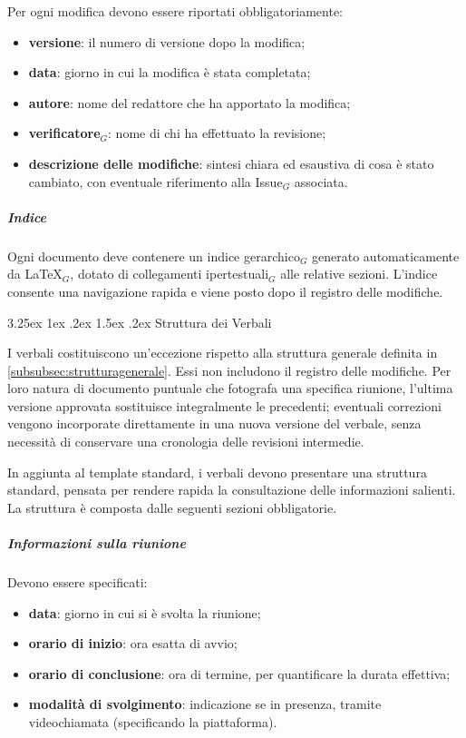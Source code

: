 \documentclass[a4paper, 10pt]{article}
\makeatletter
\renewcommand\paragraph{\@startsection{paragraph}{4}{\z@}%
  {3.25ex \@plus1ex \@minus .2ex}%
  {1.5ex \@plus .2ex}%
  {\normalfont\normalsize\bfseries}}
\makeatother
\begin{document}
Per ogni modifica devono essere riportati obbligatoriamente:
\begin{itemize}
    \item \textbf{versione}: il numero di versione dopo la modifica;
    \item \textbf{data}: giorno in cui la modifica è stata completata;
    \item \textbf{autore}: nome del redattore che ha apportato la modifica;
    \item \textbf{verificatore$_G$}: nome di chi ha effettuato la revisione;
    \item \textbf{descrizione delle modifiche}: sintesi chiara ed esaustiva di cosa è stato cambiato, con eventuale riferimento alla Issue$_G$ associata.
\end{itemize}

\subparagraph{Indice}

Ogni documento deve contenere un indice gerarchico$_G$ generato automaticamente da \LaTeX$_G$, dotato di collegamenti ipertestuali$_G$ alle relative sezioni. L'indice consente una navigazione rapida e viene posto dopo il registro delle modifiche.

\paragraph{Struttura dei Verbali}
\label{par:strutturaverbali}

I verbali costituiscono un'eccezione rispetto alla struttura generale definita in \ref{subsubsec:strutturagenerale}. Essi non includono il registro delle modifiche. Per loro natura di documento puntuale che fotografa una specifica riunione, l'ultima versione approvata sostituisce integralmente le precedenti; eventuali correzioni vengono incorporate direttamente in una nuova versione del verbale, senza necessità di conservare una cronologia delle revisioni intermedie.

In aggiunta al template standard, i verbali devono presentare una struttura standard, pensata per rendere rapida la consultazione delle informazioni salienti. La struttura è composta dalle seguenti sezioni obbligatorie.

\subparagraph{Informazioni sulla riunione}

Devono essere specificati:
\begin{itemize}
    \item \textbf{data}: giorno in cui si è svolta la riunione;
    \item \textbf{orario di inizio}: ora esatta di avvio;
    \item \textbf{orario di conclusione}: ora di termine, per quantificare la durata effettiva;
    \item \textbf{modalità di svolgimento}: indicazione se in presenza, tramite videochiamata (specificando la piattaforma).
\end{itemize}
\end{document}
